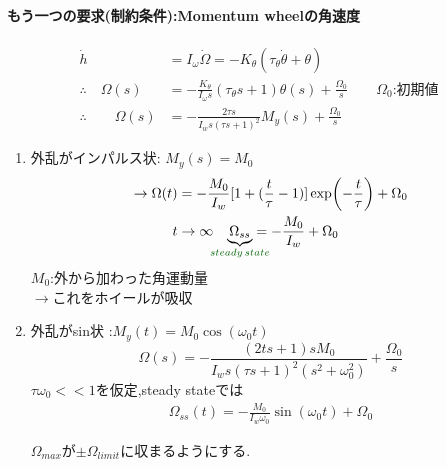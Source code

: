 \documentclass[class=article, crop=false, dvipdfmx]{standalone}
\begin{document}
\begin{enumerate}[label=(\theenumi)]
\paragraph{もう一つの要求(制約条件):Momentum wheelの角速度}
\begin{align}
\dot{h}&=
I_{\omega}\dot{\Omega}=
-K_\theta (\tau_\theta \dot{\theta} + \theta)\\
\therefore \quad \Omega (s)&=
-\frac{K_\theta}{I_\omega s}(\tau_\theta s+1)
\theta (s)+\frac{\Omega_0}{s}
\qquad \Omega_0\text{:初期値}\\
\therefore \qquad \Omega (s)&=
-\frac{2\tau s}{I_w s(\tau s+1)^2}
M_y(s)+\frac{\Omega_0}{s}
\end{align}
\begin{enumerate}
\item 外乱がインパルス状: $M_y(s) = M_0$\\
\begin{align}
\rightarrow \Omega(t) &= -
\frac{M_0}{I_w}[1 + 
(\frac{t}{\tau} - 1)]\exp(-\frac{t}{\tau}) + \Omega_0\\
t&\rightarrow \infty \quad
\underexpl{\Omega_{ss}}{\textcolor{darkgreen}{steady\,state}} = -\frac{M_0}{I_w} + \Omega_0
\end{align}
$M_0$:外から加わった角運動量\\
$\rightarrow$これをホイールが吸収

\item 外乱がsin状 :$M_y(t) = M_0 \cos(\omega_0 t)$\\
\begin{equation}
\Omega(s) = -
\frac{(2ts + 1)sM_0}{I_ws(\tau s + 1)^2 (s^2 + \omega_0 ^2)} + \frac{\Omega_0}{s}
\end{equation}
$\tau \omega_0 <<1$を仮定,steady stateでは
\begin{align}
 \Omega_{ss}(t) = - \frac{M_0}
 {I_w \omega_0}
 \sin(\omega_0 t) + \Omega_0
\end{align}

$\Omega_{max}$が$\pm\Omega_{limit}$に収まるようにする.


\end{enumerate}
\end{enumerate}
\end{document}
